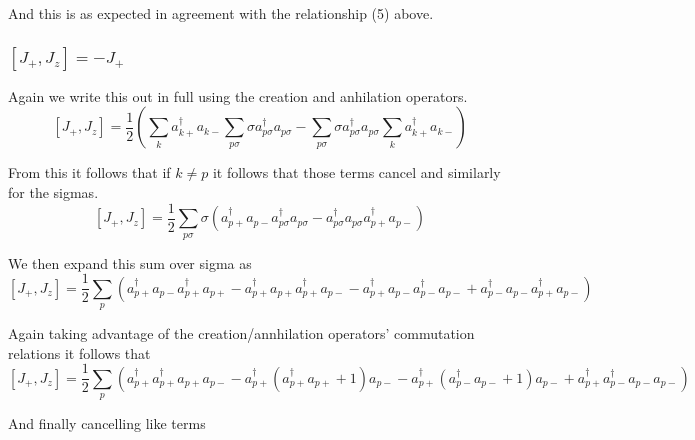 \documentclass[11pt]{article} %
\begin{document}
And this is as expected in agreement with the relationship (5) above.\\


\subsubsection{$\left[J_+,J_z\right]=-J_+$}

Again we write this out in full using the creation and anhilation operators. \\


\begin{equation}
\left[J_+,J_z\right]=\frac{1}{2} \left( \sum_k a_{k+}^\dagger a_{k-} \sum_{p\sigma}\sigma a_{p\sigma}^\dagger a_{p\sigma}- \sum_{p\sigma}\sigma a_{p\sigma}^\dagger a_{p\sigma}\sum_k a_{k+}^\dagger a_{k-}\right)
\end{equation}

From this it follows that if $k \neq p$ it follows that those terms cancel and similarly for the sigmas. \\

\begin{equation}
\left[J_+,J_z\right]=\frac{1}{2}\sum_{p\sigma} \sigma \left( a_{p+}^\dagger a_{p-}  a_{p\sigma}^\dagger a_{p\sigma}-  a_{p\sigma}^\dagger a_{p\sigma} a_{p+}^\dagger a_{p-}\right)
\end{equation}

We then expand this sum over sigma as\\

\begin{equation}
\left[J_+,J_z\right]=\frac{1}{2}\sum_{p}  \left( a_{p+}^\dagger a_{p-}  a_{p+}^\dagger a_{p+}-  a_{p+}^\dagger a_{p+} a_{p+}^\dagger a_{p-}  - a_{p+}^\dagger a_{p-}  a_{p-}^\dagger a_{p-}+  a_{p-}^\dagger a_{p-} a_{p+}^\dagger a_{p-} \right)
\end{equation}


Again taking advantage of the creation/annhilation operators' commutation relations it follows that\\


\begin{equation}
\left[J_+,J_z\right]=\frac{1}{2}\sum_{p}  \left( a_{p+}^\dagger  a_{p+}^\dagger a_{p+} a_{p-}-  a_{p+}^\dagger (a_{p+}^\dagger a_{p+}+1) a_{p-}  - a_{p+}^\dagger  (a_{p-}^\dagger a_{p-}+1)  a_{p-}+   a_{p+}^\dagger a_{p-}^\dagger a_{p-} a_{p-} \right)
\end{equation}

And finally cancelling like terms\\
\end{document}
